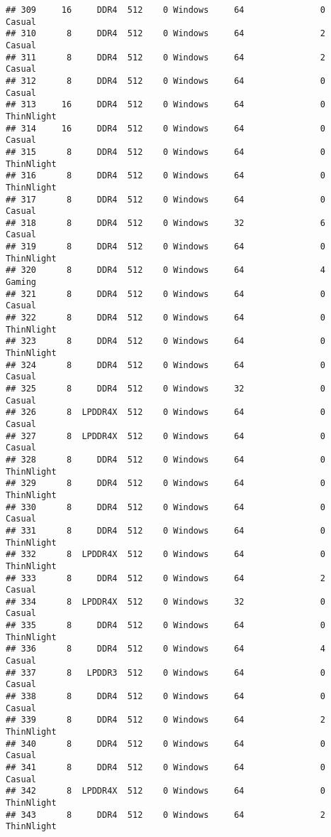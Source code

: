 \documentclass[
]{article}
\begin{document}
\begin{verbatim}
## 309     16     DDR4  512    0 Windows     64               0     Casual
## 310      8     DDR4  512    0 Windows     64               2     Casual
## 311      8     DDR4  512    0 Windows     64               2     Casual
## 312      8     DDR4  512    0 Windows     64               0     Casual
## 313     16     DDR4  512    0 Windows     64               0 ThinNlight
## 314     16     DDR4  512    0 Windows     64               0     Casual
## 315      8     DDR4  512    0 Windows     64               0 ThinNlight
## 316      8     DDR4  512    0 Windows     64               0 ThinNlight
## 317      8     DDR4  512    0 Windows     64               0     Casual
## 318      8     DDR4  512    0 Windows     32               6     Casual
## 319      8     DDR4  512    0 Windows     64               0 ThinNlight
## 320      8     DDR4  512    0 Windows     64               4     Gaming
## 321      8     DDR4  512    0 Windows     64               0     Casual
## 322      8     DDR4  512    0 Windows     64               0 ThinNlight
## 323      8     DDR4  512    0 Windows     64               0 ThinNlight
## 324      8     DDR4  512    0 Windows     64               0     Casual
## 325      8     DDR4  512    0 Windows     32               0     Casual
## 326      8  LPDDR4X  512    0 Windows     64               0     Casual
## 327      8  LPDDR4X  512    0 Windows     64               0     Casual
## 328      8     DDR4  512    0 Windows     64               0 ThinNlight
## 329      8     DDR4  512    0 Windows     64               0 ThinNlight
## 330      8     DDR4  512    0 Windows     64               0     Casual
## 331      8     DDR4  512    0 Windows     64               0 ThinNlight
## 332      8  LPDDR4X  512    0 Windows     64               0 ThinNlight
## 333      8     DDR4  512    0 Windows     64               2     Casual
## 334      8  LPDDR4X  512    0 Windows     32               0     Casual
## 335      8     DDR4  512    0 Windows     64               0 ThinNlight
## 336      8     DDR4  512    0 Windows     64               4     Casual
## 337      8   LPDDR3  512    0 Windows     64               0     Casual
## 338      8     DDR4  512    0 Windows     64               0     Casual
## 339      8     DDR4  512    0 Windows     64               2 ThinNlight
## 340      8     DDR4  512    0 Windows     64               0     Casual
## 341      8     DDR4  512    0 Windows     64               0     Casual
## 342      8  LPDDR4X  512    0 Windows     64               0 ThinNlight
## 343      8     DDR4  512    0 Windows     64               2 ThinNlight

\end{verbatim}
\end{document}
